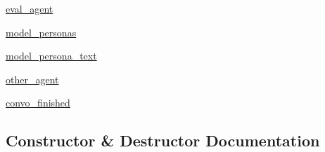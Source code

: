 \begin{DoxyCompactItemize}
\item 
\hyperlink{classprojects_1_1controllable__dialogue_1_1mturk_1_1worlds_1_1ControllableDialogEval_a0516aa56cda570506cc8b5efb02756cc}{eval\+\_\+agent}
\item 
\hyperlink{classprojects_1_1controllable__dialogue_1_1mturk_1_1worlds_1_1ControllableDialogEval_a77c385abcd738bbd5a15cdbe0289262d}{model\+\_\+personas}
\item 
\hyperlink{classprojects_1_1controllable__dialogue_1_1mturk_1_1worlds_1_1ControllableDialogEval_a0fe27b63b91f7f009e6a8afcae66db74}{model\+\_\+persona\+\_\+text}
\item 
\hyperlink{classprojects_1_1controllable__dialogue_1_1mturk_1_1worlds_1_1ControllableDialogEval_a327f0cfe1f11bcd29b129dda9b7c6cb4}{other\+\_\+agent}
\item 
\hyperlink{classprojects_1_1controllable__dialogue_1_1mturk_1_1worlds_1_1ControllableDialogEval_ae50ceac205de37d75020d34c8de50d36}{convo\+\_\+finished}
\end{DoxyCompactItemize}


\subsection{Constructor \& Destructor Documentation}
\mbox{\label{classprojects_1_1controllable__dialogue_1_1mturk_1_1worlds_1_1ControllableDialogEval_af8577bcfacb6749666bb1f86a37add05}} 
